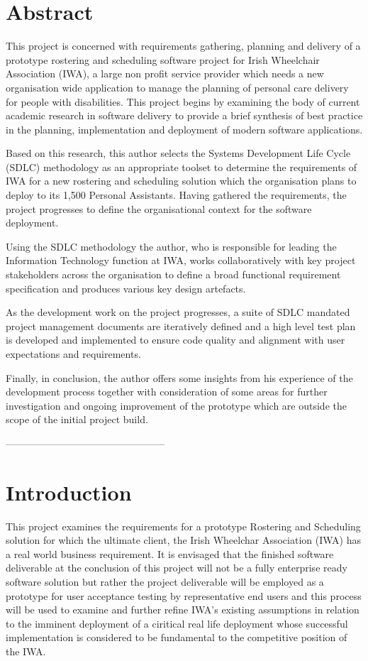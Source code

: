 \documentclass[a4paper,12pt]{article}
\begin{document}
\section*{Abstract}

This project is concerned with requirements gathering, planning and delivery of a prototype rostering and scheduling software project for Irish Wheelchair Association (IWA), a large non profit service provider which needs a new organisation wide application to manage the planning of personal care delivery for people with disabilities. This project begins by examining the body of current academic research in software delivery to provide a brief synthesis of best practice in the planning, implementation and deployment of modern software applications.

Based on this research, this author selects the Systems Development Life Cycle (SDLC) methodology as an appropriate toolset to determine the requirements of IWA for a new rostering and scheduling solution which the organisation plans to deploy to its 1,500 Personal Assistants. Having gathered the requirements, the project progresses to define the organisational context for the software deployment.

Using the SDLC methodology the author, who is responsible for leading the Information Technology function at IWA, works collaboratively with key project stakeholders across the organisation to define a broad functional requirement specification and produces various key design artefacts.

As the development work on the project progresses, a suite of SDLC mandated project management documents are iteratively defined and a high level test plan is developed and implemented to ensure code quality and alignment with user expectations and requirements.

Finally, in conclusion, the author offers some insights from his experience of the development process together with consideration of some areas for further investigation and ongoing improvement of the prototype which are outside the scope of the initial project build.

\pagebreak
\tableofcontents
\pagebreak------------------------------------------------
\section{Introduction}

This project examines the requirements for a prototype Rostering and Scheduling solution for which the ultimate client, the Irish Wheelchar Association (IWA) has a real world business requirement. It is envisaged that the finished software deliverable at the conclusion of this project will not be a fully enterprise ready software solution but rather the project deliverable will be employed as a prototype for user acceptance testing by representative end users  and this process will be used to examine and further refine IWA's existing assumptions in relation to the imminent deployment of a ciritical real life deployment whose successful implementation is considered to be fundamental to the competitive position of the IWA. 
\end{document}
